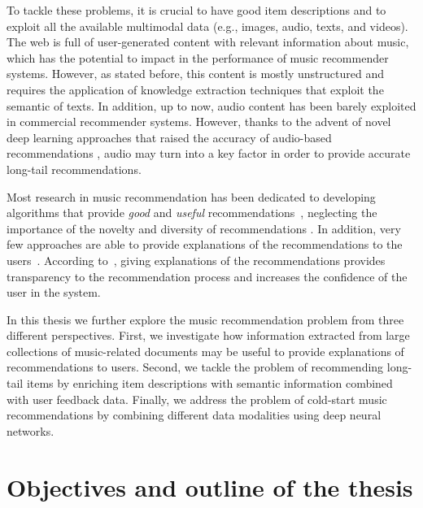 To tackle these problems, it is crucial to have good item descriptions and to exploit all the available multimodal data (e.g., images, audio, texts, and videos).
The web is full of user-generated content with relevant information about music, which has the potential to impact in the performance of music recommender systems. However, as stated before, this content is mostly unstructured and requires the application of knowledge extraction techniques that exploit the semantic of texts.
In addition, up to now, audio content has been barely exploited in commercial recommender systems. However, thanks to the advent of novel deep learning approaches that raised the accuracy of audio-based recommendations \citep{Oord2013}, audio may turn into a key factor in order to provide accurate long-tail recommendations.

Most research in music recommendation has been dedicated to developing algorithms that provide \textit{good} and \textit{useful} recommendations~\citep{oscarBook}, neglecting the importance of the novelty and diversity of recommendations \citep{adomavicius2012improving,Bellogin2010}. In addition, very few approaches are able to provide explanations of the recommendations to the users~\citep{Passant2008, Passant2010}. According to~\cite{celma2008new}, giving explanations of the recommendations provides transparency to the recommendation process and increases the confidence of the user in the system.

In this thesis we further explore the music recommendation problem from three different perspectives. First, we investigate how information extracted from large collections of music-related documents may be useful to provide explanations of recommendations to users. Second, we tackle the problem of recommending long-tail items by enriching item descriptions with semantic information combined with user feedback data. Finally, we address the problem of cold-start music recommendations by combining different data modalities using deep neural networks.


\section{Objectives and outline of the thesis}
\label{sec:intro:objectives}

